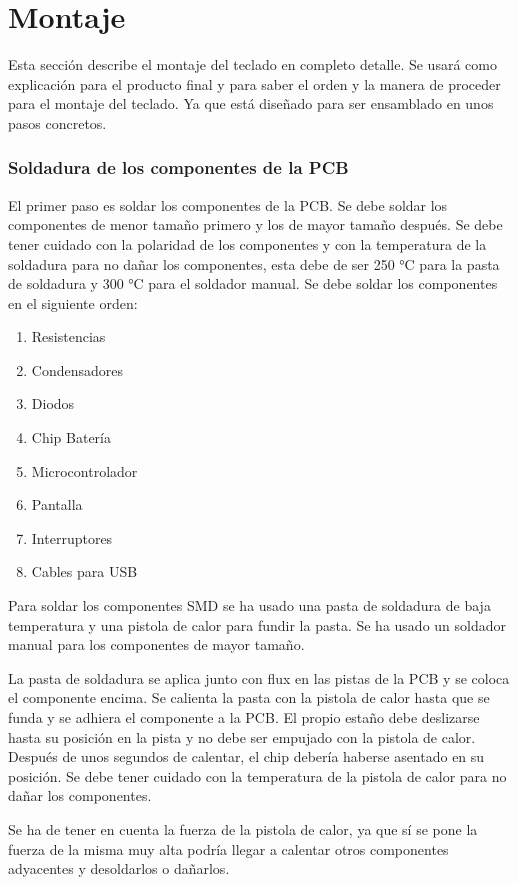 \section{Montaje}
Esta sección describe el montaje del teclado en completo detalle. Se usará como explicación para el producto final y para saber el orden y la manera de proceder para el montaje del teclado. Ya que está diseñado para ser ensamblado en unos pasos concretos.

\subsubsection{Soldadura de los componentes de la PCB}
El primer paso es soldar los componentes de la PCB. Se debe soldar los componentes de menor tamaño primero y los de mayor tamaño después. Se debe tener cuidado con la polaridad de los componentes y con la temperatura de la soldadura para no dañar los componentes, esta debe de ser 250 °C para la pasta de soldadura y 300 °C para el soldador manual. Se debe soldar los componentes en el siguiente orden:
\newpage
\begin{enumerate}
    \item Resistencias
    \item Condensadores
    \item Diodos
    \item Chip Batería
    \item Microcontrolador
    \item Pantalla
    \item Interruptores
    \item Cables para \gls{USB}
\end{enumerate}

Para soldar los componentes SMD se ha usado una pasta de soldadura de baja temperatura y una pistola de calor para fundir la pasta. Se ha usado un soldador manual para los componentes de mayor tamaño.

La pasta de soldadura se aplica junto con flux en las pistas de la \gls{PCB} y se coloca el componente encima. Se calienta la pasta con la pistola de calor hasta que se funda y se adhiera el componente a la \gls{PCB}. El propio estaño debe deslizarse hasta su posición en la pista y no debe ser empujado con la pistola de calor. Después de unos segundos de calentar, el chip debería haberse asentado en su posición. Se debe tener cuidado con la temperatura de la pistola de calor para no dañar los componentes.

Se ha de tener en cuenta la fuerza de la pistola de calor, ya que sí se pone la fuerza de la misma muy alta podría llegar a calentar otros componentes adyacentes y desoldarlos o dañarlos. \cite{SoldaduraSMD}

